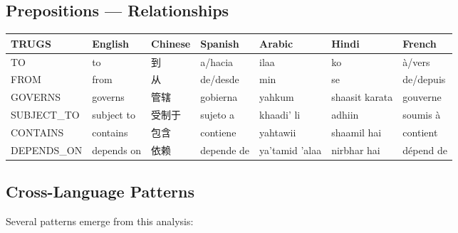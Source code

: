 \documentclass{article}
\begin{document}
\begin{CJK}{UTF8}{gbsn}
\subsection{Prepositions --- Relationships}

\begin{table}[h]
\centering
\small
\begin{tabular}{lllllll}
\toprule
\textbf{TRUGS} & \textbf{English} & \textbf{Chinese} & \textbf{Spanish} & \textbf{Arabic} & \textbf{Hindi} & \textbf{French} \\
\midrule
TO & to & 到 & a/hacia & ilaa & ko & \`a/vers \\
FROM & from & 从 & de/desde & min & se & de/depuis \\
GOVERNS & governs & 管辖 & gobierna & yahkum & shaasit karata & gouverne \\
SUBJECT\_TO & subject to & 受制于 & sujeto a & khaadi' li & adhiin & soumis \`a \\
CONTAINS & contains & 包含 & contiene & yahtawii & shaamil hai & contient \\
DEPENDS\_ON & depends on & 依赖 & depende de & ya'tamid 'alaa & nirbhar hai & d\'epend de \\
\bottomrule
\end{tabular}
\end{table}

\end{CJK}

\subsection{Cross-Language Patterns}

Several patterns emerge from this analysis:
\end{document}
